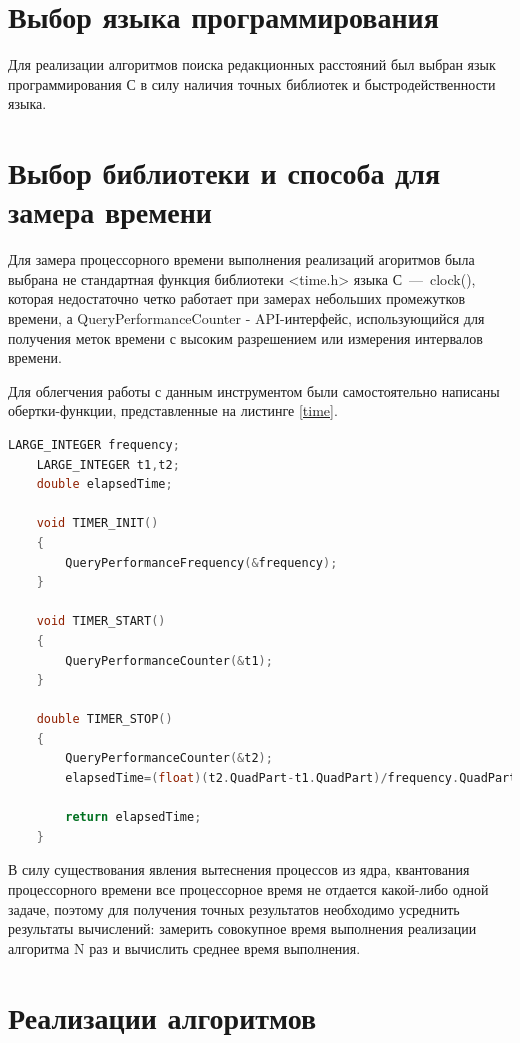 \documentclass[a4paper,14pt, unknownkeysallowed]{extreport}
\begin{document}
\section{Выбор языка программирования}
	
Для реализации алгоритмов поиска редакционных расстояний был выбран язык программирования С в силу наличия точных библиотек и быстродейственности языка.
	
\section{Выбор библиотеки и способа для замера времени}

Для замера процессорного времени выполнения реализаций агоритмов была выбрана не стандартная функция библиотеки <time.h> языка С~---~clock(), которая недостаточно четко работает при замерах небольших промежутков времени, а QueryPerformanceCounter - API-интерфейс, использующийся для получения меток времени с высоким разрешением или измерения интервалов времени.
        
Для облегчения работы с данным инструментом были самостоятельно написаны обертки-функции, представленные на листинге \ref{time}.
        
\clearpage
        
\begin{lstlisting}[label= time,caption=Функции замеров процессорного времени,language=C]
    LARGE_INTEGER frequency;
    LARGE_INTEGER t1,t2;
    double elapsedTime;

    void TIMER_INIT()
    {
        QueryPerformanceFrequency(&frequency);
    }
    
    void TIMER_START()
    {
    	QueryPerformanceCounter(&t1);
    }
    
    double TIMER_STOP()
    {
        QueryPerformanceCounter(&t2); 
        elapsedTime=(float)(t2.QuadPart-t1.QuadPart)/frequency.QuadPart/COUNT*MICRO;
    	
    	return elapsedTime;
    }

\end{lstlisting}
		
В силу существования явления вытеснения процессов из ядра, квантования процессорного времени все процессорное время не отдается какой-либо одной задаче, поэтому для получения точных результатов необходимо усреднить результаты вычислений: замерить совокупное время выполнения реализации алгоритма N раз и вычислить среднее время выполнения.
		
\section{Реализации алгоритмов}
	
\end{document}
